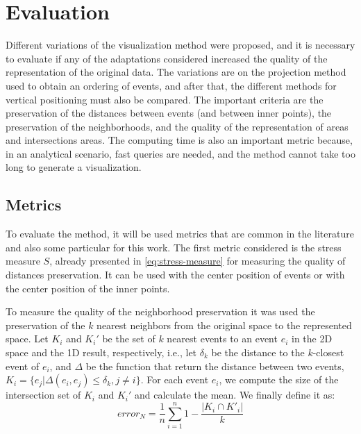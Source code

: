 \section{Evaluation}

Different variations of the visualization method were proposed, and it is necessary to evaluate if any of the adaptations considered increased the quality of the representation of the original data.
%
The variations are on the projection method used to obtain an ordering of events, and after that, the different methods for vertical positioning must also be compared.
%
The important criteria are the preservation of the distances between events (and between inner points), the preservation of the neighborhoods, and the quality of the representation of areas and intersections areas.
%
The computing time is also an important metric because, in an analytical scenario, fast queries are needed, and the method cannot take too long to generate a visualization.

\subsection{Metrics}

To evaluate the method, it will be used metrics that are common in the literature and also some particular for this work.
%
The first metric considered is the stress measure $S$, already presented in \ref{eq:stress-measure} for measuring the quality of distances preservation. It can be used with the center position of events or with the center position of the inner points.
%

%
%
%
%

To measure the quality of the neighborhood preservation it was used the preservation of the $k$ nearest neighbors from the original space to the represented space.
%
Let $K_i$ and $K_i'$ be the set of $k$ nearest events to an event $e_i$ in the 2D space and the 1D result, respectively, i.e., let $\delta_k$ be the distance to the $k$-closest event of $e_i$, and $\Delta$ be the function that return the distance between two events, $K_i = \{ e_j |  \Delta(e_i, e_j ) \leq \delta_k, j \neq i \}$.
%
For each event $e_i$, we compute the size of the intersection set of $K_i$ and $K_i'$ and calculate the mean. 
%
We finally define it as: 
%
\begin{equation}
    error_N = \frac{1}{n}\sum_{i = 1}^n 1 - \frac{|K_i \cap K'_i|}{k}
\end{equation}

